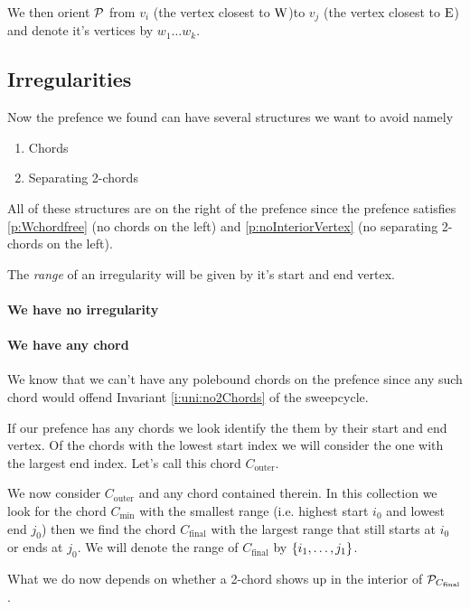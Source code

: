     We then orient $\P$ from $v_i$ (the vertex closest to $\pW$)to $v_j$ (the vertex closest to $\pE$) and denote it's vertices by $w_1 \ldots w_k$.

  \subsection{Irregularities}
    Now the prefence we found can have several structures we want to avoid
    namely
    \begin{enumerate}
      \itemsep=-4pt
      \item Chords
      \item Separating 2-chords
    \end{enumerate}

    All of these structures are on the right of the prefence since the prefence satisfies \ref{p:Wchordfree} (no chords on the left) and \ref{p:noInteriorVertex} (no separating 2-chords on the left).

    The \emph{range} of an irregularity will be given by it's start and end vertex.

    \paragraph{We have no irregularity}

    \paragraph{We have any chord}
    We know that we can't have any polebound chords on the prefence since any such chord would offend Invariant \ref{i:uni:no2Chords} of the sweepcycle.

    If our prefence has any chords we look identify the them by their start and end vertex. Of the chords with the lowest start index we will consider the one with the largest end index. Let's call this chord $C_\text{outer}$.

    We now consider $C_\text{outer}$ and any chord contained therein. In this collection we look for the chord $C_\text{min}$ with the smallest range (i.e. highest start $i_0$ and lowest end $j_0$) then we find the chord $C_\text{final}$ with the largest range that still starts at $i_0$ or ends at $j_0$. We will denote the range of $C_\text{final}$ by $\braces{i_1, \ldots, j_1}$.

    What we do now depends on whether a 2-chord shows up in the interior of $\P_{C_\text{final}}$.

